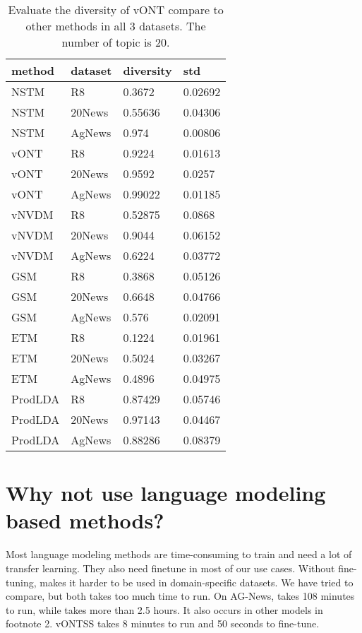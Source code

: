 \documentclass[11pt]{article}
\begin{document}
\begin{table}
\centering

\begin{tabular}{|l|l|l|l|} 
\hline
method           & dataset & diversity & std      \\ 
\hline
NSTM           & R8      & 0.3672    & 0.02692  \\ 
\hline
NSTM           & 20News  & 0.55636   & 0.04306  \\ 
\hline
NSTM           & AgNews  & 0.974     & 0.00806  \\ 
\hline
vONT    & R8      & 0.9224    & 0.01613  \\ 
\hline
vONT    & 20News  & 0.9592    & 0.0257   \\ 
\hline
vONT    & AgNews  & 0.99022   & 0.01185  \\ 
\hline
vNVDM   & R8      & 0.52875   & 0.0868   \\ 
\hline
vNVDM  & 20News  & 0.9044    & 0.06152  \\ 
\hline
vNVDM  & AgNews  & 0.6224    & 0.03772  \\ 
\hline
GSM     & R8      & 0.3868    & 0.05126  \\ 
\hline
GSM     & 20News  & 0.6648    & 0.04766  \\ 
\hline
GSM    & AgNews  & 0.576     & 0.02091  \\ 
\hline
ETM      & R8      & 0.1224    & 0.01961  \\ 
\hline
ETM     & 20News  & 0.5024    & 0.03267  \\ 
\hline
ETM       & AgNews  & 0.4896    & 0.04975  \\ 
\hline
ProdLDA & R8      & 0.87429   & 0.05746  \\ 
\hline
ProdLDA & 20News  & 0.97143   & 0.04467  \\ 
\hline
ProdLDA & AgNews  & 0.88286   & 0.08379  \\
\hline
\end{tabular}
\caption{ Evaluate the diversity of vONT compare to other methods in all 3 datasets. The number of topic is 20.}

\end{table}


\section{Why not use language modeling based methods?}
\label{language}
Most language modeling methods are time-consuming to train and need a lot of transfer learning. They also need finetune in most of our use cases.  Without fine-tuning, \cite{Bianchi2021PretrainingIA} makes it harder to be used in domain-specific datasets. We have tried \cite{Yu2021FineTuningPL,Wang2021XClassTC} to compare, but both takes too much time to run. On AG-News, \cite{Yu2021FineTuningPL} takes 108 minutes to run, while \cite{Wang2021XClassTC} takes more than 2.5 hours. It also occurs in other models in footnote 2. vONTSS takes 8 minutes to run and 50 seconds to fine-tune. 
\end{document}
